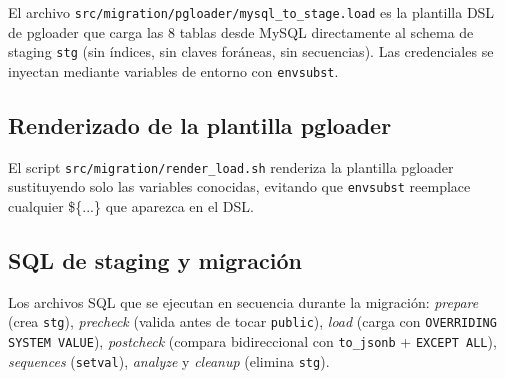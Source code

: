 El archivo \texttt{src/migration/pgloader/mysql\_to\_stage.load} es la plantilla
DSL de pgloader que carga las 8 tablas desde MySQL directamente al schema de
staging \texttt{stg} (sin índices, sin claves foráneas, sin secuencias). Las
credenciales se inyectan mediante variables de entorno con
\texttt{envsubst}.



\subsection{Renderizado de la plantilla pgloader}

El script \texttt{src/migration/render\_load.sh} renderiza la plantilla
pgloader sustituyendo solo las variables conocidas, evitando que
\texttt{envsubst} reemplace cualquier \$\{...\} que aparezca en el DSL.



\subsection{SQL de staging y migración}

Los archivos SQL que se ejecutan en secuencia durante la migración:
\emph{prepare} (crea \texttt{stg}), \emph{precheck} (valida antes de tocar
\texttt{public}), \emph{load} (carga con \texttt{OVERRIDING SYSTEM VALUE}),
\emph{postcheck} (compara bidireccional con \texttt{to\_jsonb} + \texttt{EXCEPT
ALL}), \emph{sequences} (\texttt{setval}), \emph{analyze} y \emph{cleanup}
(elimina \texttt{stg}).









